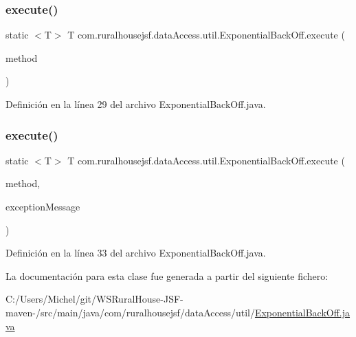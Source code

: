 \subsubsection{\texorpdfstring{execute()}{execute()}\hspace{0.1cm}{\footnotesize\ttfamily [1/2]}}
{\footnotesize\ttfamily static $<$T$>$ T com.\+ruralhousejsf.\+data\+Access.\+util.\+Exponential\+Back\+Off.\+execute (\begin{DoxyParamCaption}\item[{\mbox{\hyperlink{interfacecom_1_1ruralhousejsf_1_1data_access_1_1util_1_1_exponential_back_off_interface}{Exponential\+Back\+Off\+Interface}}$<$ T $>$}]{method }\end{DoxyParamCaption})\hspace{0.3cm}{\ttfamily [static]}}



Definición en la línea 29 del archivo Exponential\+Back\+Off.\+java.

\mbox{\label{classcom_1_1ruralhousejsf_1_1data_access_1_1util_1_1_exponential_back_off_a67faf7d5bf9a822979a6531ffc86a60d}} 
\subsubsection{\texorpdfstring{execute()}{execute()}\hspace{0.1cm}{\footnotesize\ttfamily [2/2]}}
{\footnotesize\ttfamily static $<$T$>$ T com.\+ruralhousejsf.\+data\+Access.\+util.\+Exponential\+Back\+Off.\+execute (\begin{DoxyParamCaption}\item[{\mbox{\hyperlink{interfacecom_1_1ruralhousejsf_1_1data_access_1_1util_1_1_exponential_back_off_interface}{Exponential\+Back\+Off\+Interface}}$<$ T $>$}]{method,  }\item[{String}]{exception\+Message }\end{DoxyParamCaption})\hspace{0.3cm}{\ttfamily [static]}}



Definición en la línea 33 del archivo Exponential\+Back\+Off.\+java.



La documentación para esta clase fue generada a partir del siguiente fichero\+:\begin{DoxyCompactItemize}
\item 
C\+:/\+Users/\+Michel/git/\+W\+S\+Rural\+House-\/\+J\+S\+F-\/maven-\//src/main/java/com/ruralhousejsf/data\+Access/util/\mbox{\hyperlink{_exponential_back_off_8java}{Exponential\+Back\+Off.\+java}}\end{DoxyCompactItemize}
